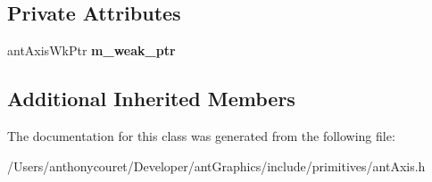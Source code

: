 \subsection*{Private Attributes}
\begin{DoxyCompactItemize}
\item 
\hypertarget{classant_axis_a2dc7112e89e7f094bca368b4c4437709}{ant\+Axis\+Wk\+Ptr {\bfseries m\+\_\+weak\+\_\+ptr}}\label{classant_axis_a2dc7112e89e7f094bca368b4c4437709}

\end{DoxyCompactItemize}
\subsection*{Additional Inherited Members}


The documentation for this class was generated from the following file\+:\begin{DoxyCompactItemize}
\item 
/\+Users/anthonycouret/\+Developer/ant\+Graphics/include/primitives/ant\+Axis.\+h\end{DoxyCompactItemize}
